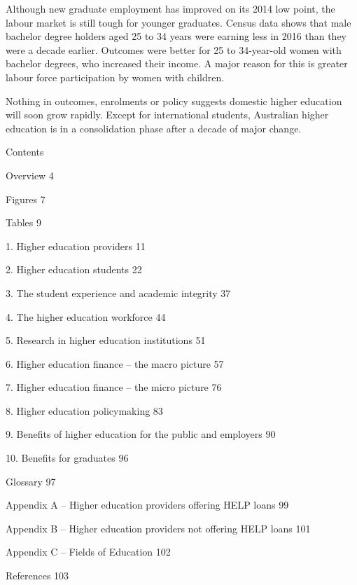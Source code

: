 \documentclass[]{book}
\begin{document}
Although new graduate employment has improved on its 2014 low point, the labour market is still tough for younger graduates. Census data shows that male bachelor degree holders aged 25 to 34 years were earning less in 2016 than they were a decade earlier. Outcomes were better for 25 to 34-year-old women with bachelor degrees, who increased their income. A major reason for this is greater labour force participation by women with children.

Nothing in outcomes, enrolments or policy suggests domestic higher education will soon grow rapidly. Except for international students, Australian higher education is in a consolidation phase after a decade of major change.

Contents

Overview 4

Figures 7

Tables 9

1. Higher education providers 11

2. Higher education students 22

3. The student experience and academic integrity 37

4. The higher education workforce 44

5. Research in higher education institutions 51

6. Higher education finance -- the macro picture 57

7. Higher education finance -- the micro picture 76

8. Higher education policymaking 83

9. Benefits of higher education for the public and employers 90

10. Benefits for graduates 96

Glossary 97

Appendix A -- Higher education providers offering HELP loans 99

Appendix B -- Higher education providers not offering HELP loans 101

Appendix C -- Fields of Education 102

References 103

\hypertarget{section}{%
\chapter{}\label{section}}

\hypertarget{section-1}{%
\chapter{\texorpdfstring{\\
}{ }}\label{section-1}}
\end{document}
